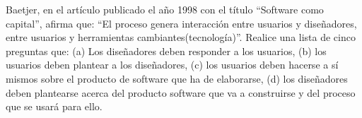 Baetjer, en el artículo publicado el año 1998 con el título “Software como capital”, afirma que: “El proceso genera interacción entre usuarios y diseñadores, entre usuarios y herramientas cambiantes(tecnología)”. Realice una lista de cinco preguntas que: (a) Los diseñadores deben responder a los usuarios, (b) los usuarios deben plantear a los diseñadores, (c) los usuarios deben hacerse a sí mismos sobre el producto de software que ha de elaborarse, (d) los diseñadores deben plantearse acerca del producto software que va a construirse y del proceso que se usará para ello.
